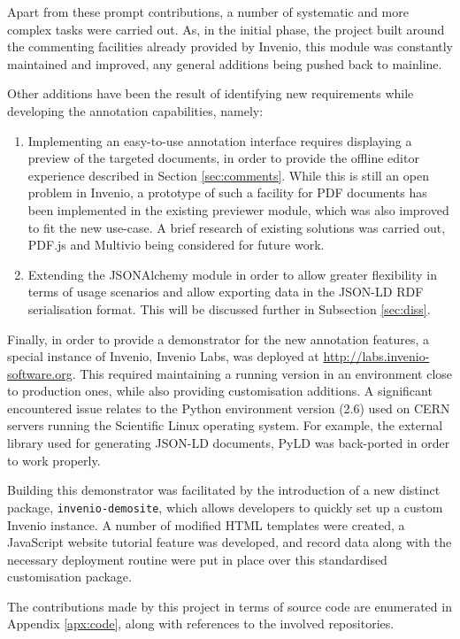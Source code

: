 Apart from these prompt contributions, a number of systematic and more
complex tasks were carried out. As, in the initial phase, the project built
around the commenting facilities already provided by Invenio, this module was
constantly maintained and improved, any general additions being pushed
back to mainline.

Other additions have been the result of identifying new requirements while
developing the annotation capabilities, namely:
\begin{enumerate}
  \item Implementing an easy-to-use annotation interface requires displaying a
        preview of the targeted documents, in order to provide the offline
        editor experience described in Section \ref{sec:comments}. While this
        is still an open problem in Invenio, a prototype of such a facility for
        PDF documents has been implemented in the existing previewer module,
        which was also improved to fit the new use-case. A brief research of
        existing solutions was carried out, PDF.js \cite{ref:pdfjs} and Multivio
        \cite{ref:multivio} being considered for future work.
  \item Extending the JSONAlchemy module in order to allow greater
        flexibility in terms of usage scenarios and allow exporting data in
        the JSON-LD RDF serialisation format. This will be discussed further in
        Subsection \ref{sec:diss}.
\end{enumerate}

Finally, in order to provide a demonstrator for the new annotation features, a
special instance of Invenio, Invenio Labs, was deployed at
\url{http://labs.invenio-software.org}. This required maintaining a running
version in an environment close to production ones, while also providing
customisation additions. A significant encountered issue relates to the Python
environment version (2.6) used on CERN servers running the Scientific Linux
operating system. For example, the external library used for generating JSON-LD
documents, PyLD \cite{ref:pyld} was back-ported in order to work properly.

Building this demonstrator was facilitated by the introduction of a new
distinct package, \texttt{invenio-demosite}, which allows developers to quickly
set up a custom Invenio instance. A number of modified HTML templates were
created, a JavaScript website tutorial feature was developed, and
record data along with the necessary deployment routine were put in
place over this standardised customisation package.

The contributions made by this project in terms of source code are
enumerated in Appendix \ref{apx:code}, along with references to the involved
repositories.
